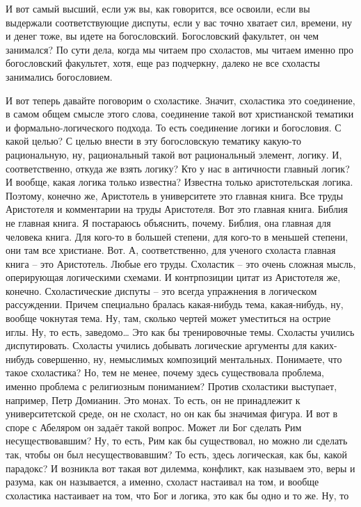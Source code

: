 И вот самый высший, если уж вы, как говорится, все освоили, если
вы выдержали соответствующие диспуты, если у вас точно хватает сил, времени, ну
и денег тоже, вы идете на богословский. Богословский факультет, он чем
занимался? По сути дела, когда мы читаем про схоластов, мы читаем именно про
богословский факультет, хотя, еще раз подчеркну, далеко не все схоласты
занимались богословием. 

И вот теперь давайте поговорим о схоластике. Значит,
схоластика это соединение, в самом общем смысле этого слова, соединение такой
вот христианской тематики и формально-логического подхода. То есть соединение
логики и богословия. С какой целью? С целью внести в эту богословскую тематику
какую-то рациональную, ну, рациональный такой вот рациональный элемент, логику.
И, соответственно, откуда же взять логику? Кто у нас в античности главный логик?
И вообще, какая логика только известна? Известна только аристотельская логика.
Поэтому, конечно же, Аристотель в университете это главная книга. Все труды
Аристотеля и комментарии на труды Аристотеля. Вот это главная книга. Библия не
главная книга. Я постараюсь объяснить, почему. Библия, она главная для человека
книга. Для кого-то в большей степени, для кого-то в меньшей степени, они там все
христиане. Вот. А, соответственно, для ученого схоласта главная книга – это
Аристотель. Любые его труды. Схоластик – это очень сложная мысль, оперирующая
логическими схемами. И контрпозиции цитат из Аристотеля же, конечно.
Схоластические диспуты – это всегда упражнения в логическом рассуждении. Причем
специально бралась какая-нибудь тема, какая-нибудь, ну, вообще чокнутая тема.
Ну, там, сколько чертей может уместиться на острие иглы. Ну, то есть, заведомо…
Это как бы тренировочные темы. Схоласты учились диспутировать. Схоласты учились
добывать логические аргументы для каких-нибудь совершенно, ну, немыслимых
композиций ментальных. Понимаете, что такое схоластика? Но, тем не менее, почему
здесь существовала проблема, именно проблема с религиозным пониманием? Против
схоластики выступает, например, Петр Домианин. Это монах. То есть, он не
принадлежит к университетской среде, он не схоласт, но он как бы значимая
фигура. И вот в споре с Абеляром он задаёт такой вопрос. Может ли Бог сделать
Рим несуществовавшим? Ну, то есть, Рим как бы существовал, но можно ли сделать
так, чтобы он был несуществовавшим? То есть, здесь логическая, как бы, какой
парадокс? И возникла вот такая вот дилемма, конфликт, как называем это, веры и
разума, как он называется, а именно, схоласт настаивал на том, и вообще
схоластика настаивает на том, что Бог и логика, это как бы одно и то же. Ну, то
